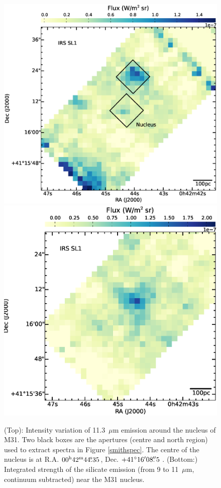 \begin{figure}
\centering
\includegraphics[width = 8 cm]{./nuc11_3.eps}
\includegraphics[scale = 0.3]{./NUCsilicate.eps}
\caption{(Top): Intensity variation of 11.3~$\mu$m emission around the nucleus of M31. 
Two black boxes are the apertures (centre and north region) used to extract spectra in Figure \ref{smithspec}. 
The centre of the nucleus is at R.A. $00^{\rm h}42^{\rm m}44\fs35$, Dec. $+41\hbox{$^\circ$}16\hbox{$^\prime$}08\hbox{$.\!\!^{\prime\prime}$}5$ \citep{NucleusREF}. %
(Bottom:) Integrated strength of the silicate emission (from 9 to 11~$\mu$m, continuum subtracted) near the M31 nucleus.} %
\label{nuc11}
\end{figure}

